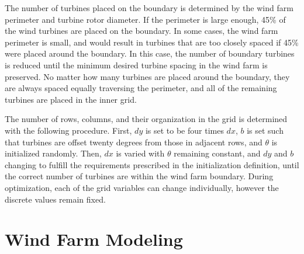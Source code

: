 \documentclass[wes, manuscript]{copernicus}
\begin{document}
The number of turbines placed on the boundary is determined by the wind farm perimeter and turbine rotor diameter. If the perimeter is large enough, 45\% of the wind turbines are placed on the boundary. In some cases, the wind farm perimeter is small, and would result in turbines that are too closely spaced if 45\% were placed around the boundary. 
In this case, the number of boundary turbines is reduced until the minimum desired turbine spacing in the wind farm is preserved.
No matter how many turbines are placed around the boundary, they are always spaced equally traversing the perimeter, and all of the remaining turbines are placed in the inner grid.

The number of rows, columns, and their organization in the grid is determined with the following procedure. First, $dy$ is set to be four times $dx$, $b$ is set such that turbines are offset twenty degrees from those in adjacent rows, and $\theta$ is initialized randomly. Then, $dx$ is varied with $\theta$ remaining constant, and $dy$ and $b$ changing to fulfill the requirements prescribed in the initialization definition, until the correct number of turbines are within the wind farm boundary. During optimization, each of the grid variables can change individually, however the discrete values remain fixed.


\section{Wind Farm Modeling}
\end{document}
